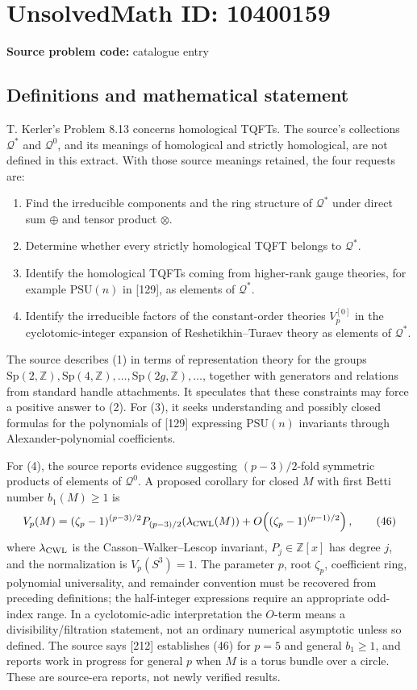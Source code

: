 \documentclass[11pt]{article}
\newcommand{\Z}{\mathbb{Z}}
\begin{document}
\section*{UnsolvedMath ID: 10400159}
\textbf{Source problem code:} catalogue entry
\subsection{Definitions and mathematical statement}
T. Kerler's Problem 8.13 concerns homological TQFTs. The source's collections \(\mathcal Q^*\) and \(\mathcal Q^0\), and its meanings of homological and strictly homological, are not defined in this extract. With those source meanings retained, the four requests are:
\begin{enumerate}
\item Find the irreducible components and the ring structure of \(\mathcal Q^*\) under direct sum \(\oplus\) and tensor product \(\otimes\).
\item Determine whether every strictly homological TQFT belongs to \(\mathcal Q^*\).
\item Identify the homological TQFTs coming from higher-rank gauge theories, for example \(\mathrm{PSU}(n)\) in [129], as elements of \(\mathcal Q^*\).
\item Identify the irreducible factors of the constant-order theories \(V_p^{[0]}\) in the cyclotomic-integer expansion of Reshetikhin--Turaev theory as elements of \(\mathcal Q^*\).
\end{enumerate}
The source describes (1) in terms of representation theory for the groups \(\mathrm{Sp}(2,\Z),\mathrm{Sp}(4,\Z),\ldots,\mathrm{Sp}(2g,\Z),\ldots\), together with generators and relations from standard handle attachments. It speculates that these constraints may force a positive answer to (2). For (3), it seeks understanding and possibly closed formulas for the polynomials of [129] expressing \(\mathrm{PSU}(n)\) invariants through Alexander-polynomial coefficients.

For (4), the source reports evidence suggesting \((p-3)/2\)-fold symmetric products of elements of \(\mathcal Q^0\). A proposed corollary for closed \(M\) with first Betti number \(b_1(M)\ge1\) is
\[
 V_p(M)=(\zeta_p-1)^{(p-3)/2}
 P_{(p-3)/2}\!\left(\lambda_{\rm CWL}(M)\right)
 +O\!\left((\zeta_p-1)^{(p-1)/2}\right),\tag{46}
\]
where \(\lambda_{\rm CWL}\) is the Casson--Walker--Lescop invariant, \(P_j\in\Z[x]\) has degree \(j\), and the normalization is \(V_p(S^3)=1\). The parameter \(p\), root \(\zeta_p\), coefficient ring, polynomial universality, and remainder convention must be recovered from preceding definitions; the half-integer expressions require an appropriate odd-index range. In a cyclotomic-adic interpretation the \(O\)-term means a divisibility/filtration statement, not an ordinary numerical asymptotic unless so defined. The source says [212] establishes (46) for \(p=5\) and general \(b_1\ge1\), and reports work in progress for general \(p\) when \(M\) is a torus bundle over a circle. These are source-era reports, not newly verified results.
\end{document}
